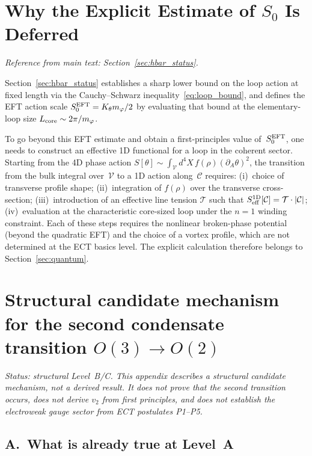 \documentclass[11pt,a4paper]{article}
\numberwithin{equation}{section}
\begin{document}
\section{Why the Explicit Estimate of $S_0$ Is Deferred}
\label{app:Sloop_calc}

\textit{Reference from main text: Section~\ref{sec:hbar_status}.}

Section~\ref{sec:hbar_status} establishes a sharp lower bound on the
loop action at fixed length via the Cauchy--Schwarz
inequality~\eqref{eq:loop_bound}, and defines the EFT action scale
$S_0^{\rm EFT}=K_\theta m_\varphi/2$ by evaluating that bound at
the elementary-loop size $L_{\rm core}\sim 2\pi/m_\varphi$.

To go beyond this EFT estimate and obtain a first-principles value
of~$S_0^{\rm EFT}$, one needs to construct an effective 1D functional
for a loop in the coherent sector.
Starting from the 4D phase action
$S[\theta]\sim\int_{\mathcal{V}}d^4X\,f(\rho)(\partial_A\theta)^2$,
the transition from the bulk integral over~$\mathcal{V}$ to a
1D action along~$\mathcal{C}$ requires:
(i)~choice of transverse profile shape;
(ii)~integration of $f(\rho)$ over the transverse cross-section;
(iii)~introduction of an effective line tension $\mathcal{T}$
     such that $S_{\rm eff}^{\rm 1D}[\mathcal{C}]=\mathcal{T}\cdot|\mathcal{C}|$;
(iv)~evaluation at the characteristic core-sized loop under the $n=1$
     winding constraint.
Each of these steps requires the nonlinear broken-phase potential
(beyond the quadratic EFT) and the choice of a vortex profile,
which are not determined at the ECT basics level.
The explicit calculation therefore belongs to Section~\ref{sec:quantum}.



\section{Structural candidate mechanism for the second condensate
transition $O(3)\to O(2)$}
\label{app:second_transition}

\textit{Status: structural Level~B/C.
This appendix describes a structural candidate mechanism, not a
derived result.
It does not prove that the second transition occurs, does not
derive $v_2$ from first principles, and does not establish
the electroweak gauge sector from ECT postulates P1--P5.}

\subsection*{A.\ What is already true at Level~A}
\end{document}
